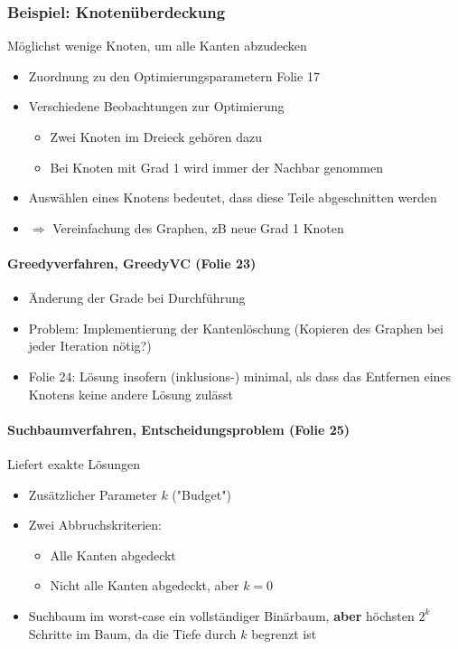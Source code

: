 \documentclass[ngerman]{scrartcl}
\begin{document}
\subsubsection{Beispiel: Knotenüberdeckung}
Möglichst wenige Knoten, um alle Kanten abzudecken
\begin{itemize}
  \item Zuordnung zu den Optimierungsparametern Folie 17
  \item Verschiedene Beobachtungen zur Optimierung
  \begin{itemize}
    \item Zwei Knoten im Dreieck gehören dazu
    \item Bei Knoten mit Grad 1 wird immer der Nachbar genommen
  \end{itemize}
  \item Auswählen eines Knotens bedeutet, dass diese Teile abgeschnitten werden
  \item $\Rightarrow$ Vereinfachung des Graphen, zB neue Grad 1 Knoten
\end{itemize}

\paragraph*{Greedyverfahren, GreedyVC (Folie 23)}
\begin{itemize}
  \item Änderung der Grade bei Durchführung	
  \item Problem: Implementierung der Kantenlöschung (Kopieren des Graphen bei jeder Iteration nötig?)
  \item Folie 24: Lösung insofern (inklusions-) minimal, als dass das Entfernen eines Knotens keine andere Lösung zulässt
\end{itemize}

\paragraph*{Suchbaumverfahren, Entscheidungsproblem (Folie 25)}
Liefert exakte Lösungen
\begin{itemize}
  \item Zusätzlicher Parameter $ k $ ("Budget")
  \item Zwei Abbruchskriterien:
  \begin{itemize}
    \item Alle Kanten abgedeckt
    \item Nicht alle Kanten abgedeckt, aber $ k=0 $
  \end{itemize}
  \item Suchbaum im worst-case ein vollständiger Binärbaum, \textbf{aber} höchsten $ 2^{k} $ Schritte im Baum, da die Tiefe durch $ k $ begrenzt ist
\end{itemize}
\end{document}
